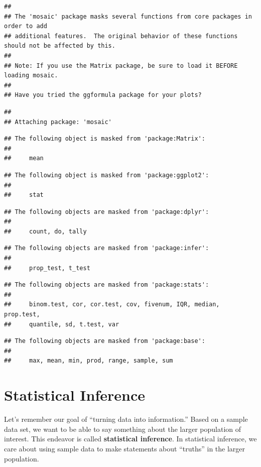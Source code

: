 \documentclass[
]{book}
\begin{document}
\begin{verbatim}
## 
## The 'mosaic' package masks several functions from core packages in order to add 
## additional features.  The original behavior of these functions should not be affected by this.
## 
## Note: If you use the Matrix package, be sure to load it BEFORE loading mosaic.
## 
## Have you tried the ggformula package for your plots?
\end{verbatim}

\begin{verbatim}
## 
## Attaching package: 'mosaic'
\end{verbatim}

\begin{verbatim}
## The following object is masked from 'package:Matrix':
## 
##     mean
\end{verbatim}

\begin{verbatim}
## The following object is masked from 'package:ggplot2':
## 
##     stat
\end{verbatim}

\begin{verbatim}
## The following objects are masked from 'package:dplyr':
## 
##     count, do, tally
\end{verbatim}

\begin{verbatim}
## The following objects are masked from 'package:infer':
## 
##     prop_test, t_test
\end{verbatim}

\begin{verbatim}
## The following objects are masked from 'package:stats':
## 
##     binom.test, cor, cor.test, cov, fivenum, IQR, median, prop.test,
##     quantile, sd, t.test, var
\end{verbatim}

\begin{verbatim}
## The following objects are masked from 'package:base':
## 
##     max, mean, min, prod, range, sample, sum
\end{verbatim}

\hypertarget{statistical-inference}{%
\chapter{Statistical Inference}\label{statistical-inference}}

Let's remember our goal of ``turning data into information.'' Based on a sample data set, we want to be able to say something about the larger population of interest. This endeavor is called \textbf{statistical inference}. In statistical inference, we care about using sample data to make statements about ``truths'' in the larger population.
\end{document}

